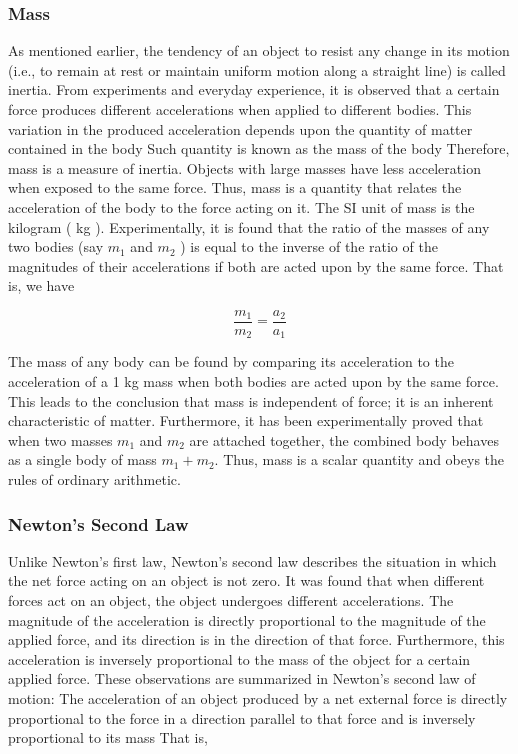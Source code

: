 \documentclass[10pt]{article}
\numberwithin{equation}{section}
\begin{document}
\subsubsection{Mass}\label{sec:3-2-3}
As mentioned earlier, the tendency of an object to resist any change in its motion (i.e., to remain at rest or maintain uniform motion along a straight line) is called inertia. From experiments and everyday experience, it is observed that a certain force produces different accelerations when applied to different bodies. This variation in the produced acceleration depends upon the quantity of matter contained in the body Such quantity is known as the mass of the body Therefore, mass is a measure of inertia. Objects with large masses have less acceleration when exposed to the same force. Thus, mass is a quantity that relates the acceleration of the body to the force acting on it. The SI unit of mass is the kilogram ( kg ). Experimentally, it is found that the ratio of the masses of any two bodies (say $m_{1}$ and $m_{2}$ ) is equal to the inverse of the ratio of the magnitudes of their accelerations if both are acted upon by the same force. That is, we have

$$
\frac{m_{1}}{m_{2}}=\frac{a_{2}}{a_{1}}
$$

The mass of any body can be found by comparing its acceleration to the acceleration of a 1 kg mass when both bodies are acted upon by the same force. This leads to the conclusion that mass is independent of force; it is an inherent characteristic of matter. Furthermore, it has been experimentally proved that when two masses $m_{1}$ and $m_{2}$ are attached together, the combined body behaves as a single body of mass $m_{1}+m_{2}$. Thus, mass is a scalar quantity and obeys the rules of ordinary arithmetic.

\subsubsection{Newton's Second Law}\label{sec:3-2-4}
Unlike Newton's first law, Newton's second law describes the situation in which the net force acting on an object is not zero. It was found that when different forces act on an object, the object undergoes different accelerations. The magnitude of the acceleration is directly proportional to the magnitude of the applied force, and its direction is in the direction of that force. Furthermore, this acceleration is inversely proportional to the mass of the object for a certain applied force. These observations are summarized in Newton's second law of motion: The acceleration of an object produced by a net external force is directly proportional to the force in a direction parallel to that force and is inversely proportional to its mass That is,
\end{document}
